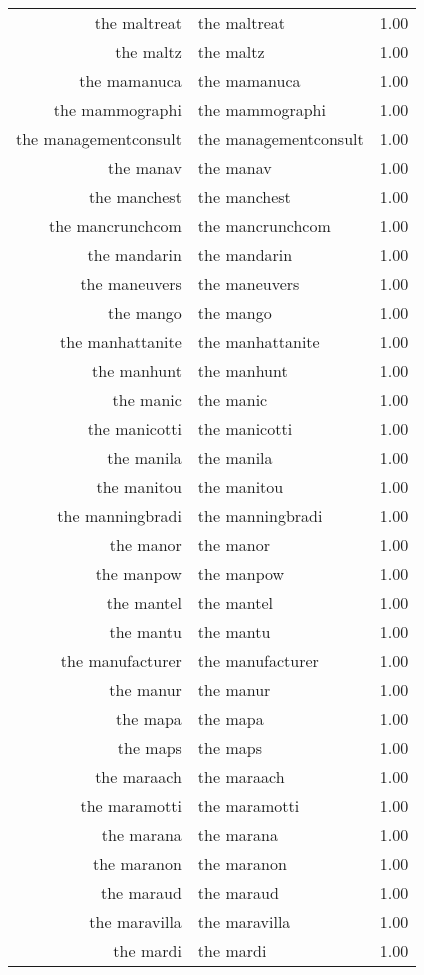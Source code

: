 \begin{table}[ht]
\begin{tabular}{rlr}
  the maltreat & the maltreat & 1.00 \\ 
  the maltz & the maltz & 1.00 \\ 
  the mamanuca & the mamanuca & 1.00 \\ 
  the mammographi & the mammographi & 1.00 \\ 
  the managementconsult & the managementconsult & 1.00 \\ 
  the manav & the manav & 1.00 \\ 
  the manchest & the manchest & 1.00 \\ 
  the mancrunchcom & the mancrunchcom & 1.00 \\ 
  the mandarin & the mandarin & 1.00 \\ 
  the maneuvers & the maneuvers & 1.00 \\ 
  the mango & the mango & 1.00 \\ 
  the manhattanite & the manhattanite & 1.00 \\ 
  the manhunt & the manhunt & 1.00 \\ 
  the manic & the manic & 1.00 \\ 
  the manicotti & the manicotti & 1.00 \\ 
  the manila & the manila & 1.00 \\ 
  the manitou & the manitou & 1.00 \\ 
  the manningbradi & the manningbradi & 1.00 \\ 
  the manor & the manor & 1.00 \\ 
  the manpow & the manpow & 1.00 \\ 
  the mantel & the mantel & 1.00 \\ 
  the mantu & the mantu & 1.00 \\ 
  the manufacturer & the manufacturer & 1.00 \\ 
  the manur & the manur & 1.00 \\ 
  the mapa & the mapa & 1.00 \\ 
  the maps & the maps & 1.00 \\ 
  the maraach & the maraach & 1.00 \\ 
  the maramotti & the maramotti & 1.00 \\ 
  the marana & the marana & 1.00 \\ 
  the maranon & the maranon & 1.00 \\ 
  the maraud & the maraud & 1.00 \\ 
  the maravilla & the maravilla & 1.00 \\ 
  the mardi & the mardi & 1.00 \\ 

\end{tabular}
\end{table}
